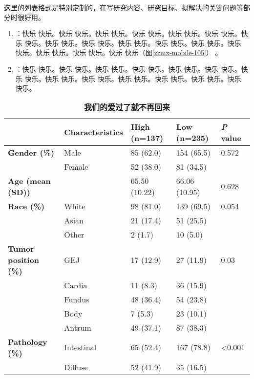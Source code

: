 这里的列表格式是特别定制的，在写研究内容、研究目标、拟解决的关键问题等部分时很好用。

\begin{enumerate}
    \item {}：快乐 快乐。快乐 快乐。快乐 快乐。快乐 快乐。快乐 快乐。快乐 快乐。快乐 快乐。快乐 快乐。快乐 快乐。快乐 快乐。快乐 快乐。快乐 快乐。快乐 快乐。快乐 快乐。快乐 快乐。快乐 快乐（图\ref{zzmx-mobile-105}） 。
    \item {}：快乐 快乐。快乐 快乐。快乐 快乐。快乐 快乐。快乐 快乐。快乐 快乐。快乐 快乐。快乐 快乐。快乐 快乐。快乐 快乐。快乐 快乐。快乐 快乐。快乐 快乐。
\end{enumerate}


\begin{table}[htbp]
    \centering
    \fontsize{11}{11}\selectfont
    \caption{\textbf{我们的爱过了就不再回来}}
    \begin{tabular}{lllll}
    \toprule
            & \textbf{Characteristics} & \textbf{High (n=137)} & \textbf{Low (n=235)} & \textbf{\textit{P} value} \\
    \toprule
    \textbf{Gender (\%)} & Male  & 85 (62.0) & 154 (65.5) & 0.572 \\
            & Female & 52 (38.0) & 81 (34.5) &  \\
    \textbf{Age (mean (SD))} &       & 65.50 (10.22) & 66.06 (10.95) & 0.628 \\
    \textbf{Race (\%)} & White & 98 (81.0) & 139 (69.5) & 0.054 \\
            & Asian & 21 (17.4) & 51 (25.5) &  \\
            & Other & 2 (1.7) & 10 (5.0) &  \\
    \textbf{Tumor position (\%)} & GEJ   & 17 (12.9) & 27 (11.9) & 0.03 \\
            & Cardia & 11 (8.3) & 36 (15.9) &  \\
            & Fundus & 48 (36.4) & 54 (23.8) &  \\
            & Body  & 7 (5.3) & 23 (10.1) &  \\
            & Antrum & 49 (37.1) & 87 (38.3) &  \\
    \textbf{Pathology (\%)} & Intestinal & 65 (52.4) & 167 (78.8) & <0.001 \\
            & Diffuse & 52 (41.9) & 35 (16.5) &  \\

\end{tabular}
\end{table}
